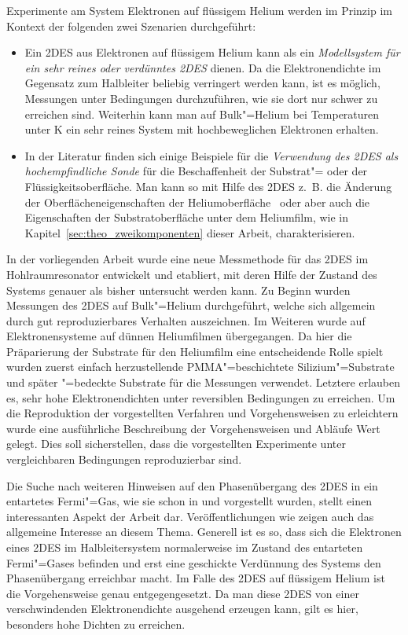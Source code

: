 Experimente am System Elektronen auf flüssigem Helium werden im Prinzip im Kontext der folgenden zwei Szenarien durchgeführt:
\begin{itemize}
	\item Ein 2DES aus Elektronen auf flüssigem Helium kann als ein {\itshape Modellsystem für ein sehr reines oder verdünntes 2DES} dienen. Da die Elektronendichte im Gegensatz zum Halbleiter beliebig verringert werden kann, ist es möglich, Messungen unter Bedingungen durchzuführen, wie sie dort nur schwer zu erreichen sind. Weiterhin kann man auf Bulk"=Helium bei Temperaturen unter \unit[1]{K} ein sehr reines System mit hochbeweglichen Elektronen erhalten.
	\item In der Literatur finden sich einige Beispiele für die {\itshape Verwendung des 2DES als hochempfindliche Sonde} für die Beschaffenheit der Substrat"= oder der Flüssigkeitsoberfläche. Man kann so mit Hilfe des 2DES z.~B. die Änderung der Oberflächeneigenschaften der Heliumoberfläche~\cite{Kon00} oder aber auch die Eigenschaften der Substratoberfläche unter dem Heliumfilm, wie in Kapitel~\ref{sec:theo_zweikomponenten} dieser Arbeit, charakterisieren.
\end{itemize}

In der vorliegenden Arbeit wurde eine neue Messmethode für das 2DES im Hohlraumresonator entwickelt und etabliert, mit deren Hilfe der Zustand des Systems genauer als bisher untersucht werden kann. Zu Beginn wurden Messungen des 2DES auf Bulk"=Helium durchgeführt, welche sich allgemein durch gut reproduzierbares Verhalten auszeichnen. Im Weiteren wurde auf Elektronensysteme auf dünnen Heliumfilmen übergegangen. Da hier die Präparierung der Substrate für den Heliumfilm eine entscheidende Rolle spielt wurden zuerst einfach herzustellende PMMA"=beschichtete Silizium"=Substrate und später \SiO"=bedeckte Substrate für die Messungen verwendet. Letztere erlauben es, sehr hohe Elektronendichten unter reversiblen Bedingungen zu erreichen. Um die Reproduktion der vorgestellten Verfahren und Vorgehensweisen zu erleichtern wurde eine ausführliche Beschreibung der Vorgehensweisen und Abläufe Wert gelegt. Dies soll sicherstellen, dass die vorgestellten Experimente unter vergleichbaren Bedingungen reproduzierbar sind.

Die Suche nach weiteren Hinweisen auf den Phasenübergang des 2DES in ein entartetes Fermi"=Gas, wie sie schon in \cite{guenzler} und \cite{Gue96} vorgestellt wurden, stellt einen interessanten Aspekt der Arbeit dar. Veröffentlichungen wie \cite{Vos98} zeigen auch das allgemeine Interesse an diesem Thema. Generell ist es so, dass sich die Elektronen eines 2DES im Halbleitersystem normalerweise im  Zustand des entarteten Fermi"=Gases befinden und erst eine geschickte \glqq{}Verdünnung\grqq{} des Systems den Phasenübergang erreichbar macht. Im Falle des 2DES auf flüssigem Helium ist die Vorgehensweise genau entgegengesetzt. Da man diese 2DES von einer verschwindenden Elektronendichte ausgehend erzeugen kann, gilt es hier, besonders hohe Dichten zu erreichen.

